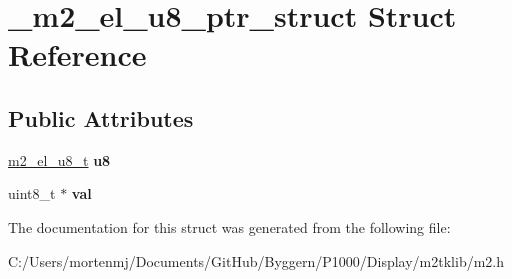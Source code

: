 \hypertarget{struct__m2__el__u8__ptr__struct}{\section{\-\_\-m2\-\_\-el\-\_\-u8\-\_\-ptr\-\_\-struct Struct Reference}
\label{struct__m2__el__u8__ptr__struct}
}
\subsection*{Public Attributes}
\begin{DoxyCompactItemize}
\item 
\hypertarget{struct__m2__el__u8__ptr__struct_ac3f10263faaab9d6a46ae16ee9cc9b80}{\hyperlink{struct__m2__el__u8__struct}{m2\-\_\-el\-\_\-u8\-\_\-t} {\bfseries u8}}\label{struct__m2__el__u8__ptr__struct_ac3f10263faaab9d6a46ae16ee9cc9b80}

\item 
\hypertarget{struct__m2__el__u8__ptr__struct_a8267b00982e49213d93df9250598f039}{uint8\-\_\-t $\ast$ {\bfseries val}}\label{struct__m2__el__u8__ptr__struct_a8267b00982e49213d93df9250598f039}

\end{DoxyCompactItemize}


The documentation for this struct was generated from the following file\-:\begin{DoxyCompactItemize}
\item 
C\-:/\-Users/mortenmj/\-Documents/\-Git\-Hub/\-Byggern/\-P1000/\-Display/m2tklib/m2.\-h\end{DoxyCompactItemize}
